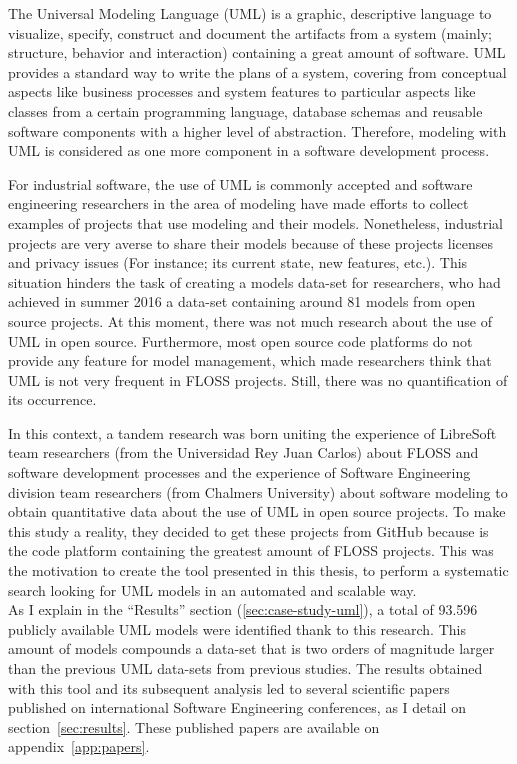 \documentclass[a4paper, 12pt]{book}
\begin{document}
The Universal Modeling Language (UML) is a graphic, descriptive language to visualize, specify, construct and document the
artifacts from a system (mainly; structure, behavior and interaction) containing a great amount of software.
UML provides a standard way to write the plans of a system, covering from conceptual aspects like business processes and
system features to particular aspects like classes from a certain programming language, database schemas and reusable
software components with a higher level of abstraction. Therefore, modeling with UML is considered as one more component
in a software development process.\par
For industrial software, the use of UML is commonly accepted and software engineering researchers in the area of modeling
have made efforts to collect examples of projects that use modeling and their models. Nonetheless, industrial projects
are very averse to share their models because of these projects licenses and privacy issues (For instance; its current
state, new features, etc.).
This situation hinders the task of creating a models data-set for researchers, who had achieved in summer 2016 a data-set
containing around 81 models from open source projects. At this moment, there was not much research about the use of UML in open source.
Furthermore, most open source code platforms do not provide any feature for model management, which made researchers think that UML
is not very frequent in FLOSS projects.
Still, there was no quantification of its occurrence.\par
In this context, a tandem research was born uniting the experience of LibreSoft team researchers (from the Universidad Rey Juan Carlos) about
FLOSS and software development processes and the experience of Software Engineering division team researchers (from Chalmers University)
about software modeling to obtain quantitative data about the use of UML in open source projects. To make this study a reality, they
decided to get these projects from GitHub because is the code platform containing the greatest amount of FLOSS projects.
This was the motivation to create the tool presented in this thesis, to perform a systematic search looking for UML models in
an automated and scalable way.\\
As I explain in the ``Results'' section (\ref{sec:case-study-uml}), a total of 93.596 publicly available UML models were identified thank to this research.
This amount of models compounds a data-set that is two orders of magnitude larger than the previous UML data-sets from previous studies. The results
obtained with this tool and its subsequent analysis led to several scientific papers published on international Software Engineering conferences,
as I detail on section~\ref{sec:results}. These published papers are available on appendix~\ref{app:papers}.
\end{document}
